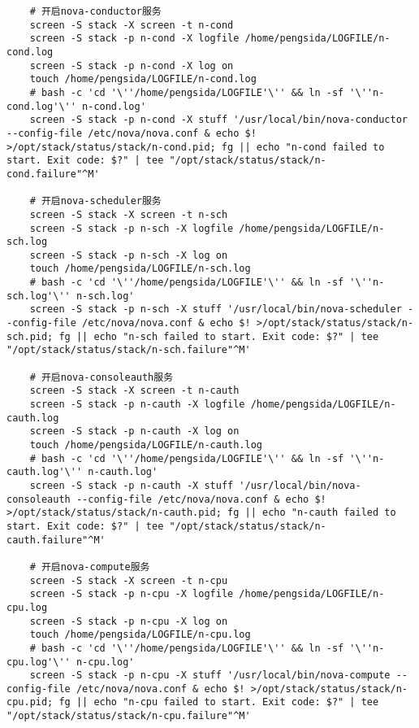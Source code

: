 \documentclass[a4paper,left=1.5cm,right=1.5cm,11pt]{article}
\begin{document}
	\begin{lstlisting}
	# 开启nova-conductor服务
	screen -S stack -X screen -t n-cond
	screen -S stack -p n-cond -X logfile /home/pengsida/LOGFILE/n-cond.log
    screen -S stack -p n-cond -X log on
	touch /home/pengsida/LOGFILE/n-cond.log
    # bash -c 'cd '\''/home/pengsida/LOGFILE'\'' && ln -sf '\''n-cond.log'\'' n-cond.log'
	screen -S stack -p n-cond -X stuff '/usr/local/bin/nova-conductor --config-file /etc/nova/nova.conf & echo $! >/opt/stack/status/stack/n-cond.pid; fg || echo "n-cond failed to start. Exit code: $?" | tee "/opt/stack/status/stack/n-cond.failure"^M'

	# 开启nova-scheduler服务
	screen -S stack -X screen -t n-sch
	screen -S stack -p n-sch -X logfile /home/pengsida/LOGFILE/n-sch.log
    screen -S stack -p n-sch -X log on
	touch /home/pengsida/LOGFILE/n-sch.log
    # bash -c 'cd '\''/home/pengsida/LOGFILE'\'' && ln -sf '\''n-sch.log'\'' n-sch.log'
	screen -S stack -p n-sch -X stuff '/usr/local/bin/nova-scheduler --config-file /etc/nova/nova.conf & echo $! >/opt/stack/status/stack/n-sch.pid; fg || echo "n-sch failed to start. Exit code: $?" | tee "/opt/stack/status/stack/n-sch.failure"^M'

	# 开启nova-consoleauth服务
	screen -S stack -X screen -t n-cauth
	screen -S stack -p n-cauth -X logfile /home/pengsida/LOGFILE/n-cauth.log
    screen -S stack -p n-cauth -X log on
	touch /home/pengsida/LOGFILE/n-cauth.log
    # bash -c 'cd '\''/home/pengsida/LOGFILE'\'' && ln -sf '\''n-cauth.log'\'' n-cauth.log'
	screen -S stack -p n-cauth -X stuff '/usr/local/bin/nova-consoleauth --config-file /etc/nova/nova.conf & echo $! >/opt/stack/status/stack/n-cauth.pid; fg || echo "n-cauth failed to start. Exit code: $?" | tee "/opt/stack/status/stack/n-cauth.failure"^M'

	# 开启nova-compute服务
	screen -S stack -X screen -t n-cpu
	screen -S stack -p n-cpu -X logfile /home/pengsida/LOGFILE/n-cpu.log
    screen -S stack -p n-cpu -X log on
	touch /home/pengsida/LOGFILE/n-cpu.log
    # bash -c 'cd '\''/home/pengsida/LOGFILE'\'' && ln -sf '\''n-cpu.log'\'' n-cpu.log'
	screen -S stack -p n-cpu -X stuff '/usr/local/bin/nova-compute --config-file /etc/nova/nova.conf & echo $! >/opt/stack/status/stack/n-cpu.pid; fg || echo "n-cpu failed to start. Exit code: $?" | tee "/opt/stack/status/stack/n-cpu.failure"^M'
	\end{lstlisting}
\end{document}
